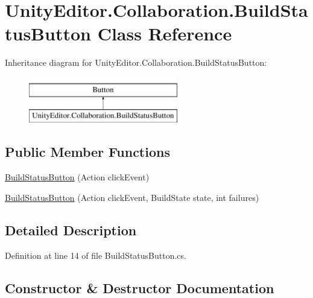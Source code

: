 \hypertarget{class_unity_editor_1_1_collaboration_1_1_build_status_button}{}\section{Unity\+Editor.\+Collaboration.\+Build\+Status\+Button Class Reference}
\label{class_unity_editor_1_1_collaboration_1_1_build_status_button}
Inheritance diagram for Unity\+Editor.\+Collaboration.\+Build\+Status\+Button\+:\begin{figure}[H]
\begin{center}
\leavevmode
\includegraphics[height=2.000000cm]{class_unity_editor_1_1_collaboration_1_1_build_status_button}
\end{center}
\end{figure}
\subsection*{Public Member Functions}
\begin{DoxyCompactItemize}
\item 
\mbox{\hyperlink{class_unity_editor_1_1_collaboration_1_1_build_status_button_a3351e08ca37b7ed9b7b344457b50cf95}{Build\+Status\+Button}} (Action click\+Event)
\item 
\mbox{\hyperlink{class_unity_editor_1_1_collaboration_1_1_build_status_button_ac7815a85706c872cbdf3eb3d025b89c0}{Build\+Status\+Button}} (Action click\+Event, Build\+State state, int failures)
\end{DoxyCompactItemize}


\subsection{Detailed Description}


Definition at line 14 of file Build\+Status\+Button.\+cs.



\subsection{Constructor \& Destructor Documentation}
\mbox{\label{class_unity_editor_1_1_collaboration_1_1_build_status_button_a3351e08ca37b7ed9b7b344457b50cf95}} 
